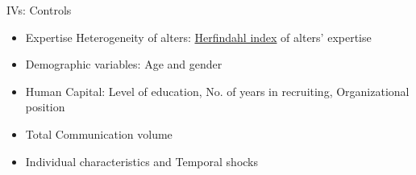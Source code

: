 \begin{frame}{{\color{violet}IVs: Controls}}

  \begin{itemize}
    \item Expertise Heterogeneity of alters: \underline{Herfindahl index} of alters' expertise
    \item Demographic variables: Age and gender
    \item Human Capital: Level of education, No. of years in recruiting, Organizational position
    \item Total Communication volume
    \item Individual characteristics and Temporal shocks
  \end{itemize}

\end{frame}
